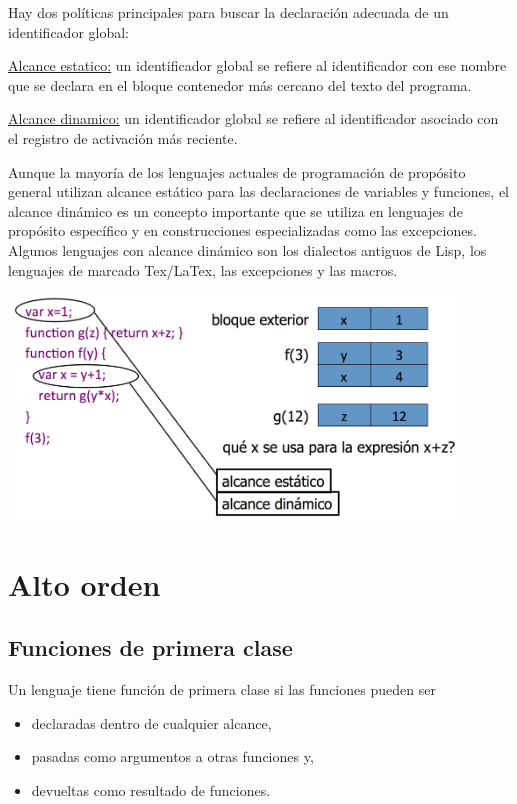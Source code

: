\documentclass[10pt,a4paper]{report}
\begin{document}
Hay dos políticas principales para buscar la declaración adecuada de
un identificador global:

\begin{description}
\item \underline{Alcance estatico:} un identificador global se refiere al identificador con ese nombre que se declara en el bloque contenedor más cercano del texto del programa.
\item \underline{Alcance dinamico:} un identificador global se refiere al identificador asociado con el registro de activación más reciente.
\end{description}

\par Aunque la mayoría de los lenguajes actuales de programación de
propósito general utilizan alcance estático para las declaraciones de
variables y funciones, el alcance dinámico es un concepto importante
que se utiliza en lenguajes de propósito específico y en
construcciones especializadas como las excepciones. Algunos lenguajes
con alcance dinámico son los dialectos antiguos de Lisp, los lenguajes
de marcado Tex/LaTex, las excepciones y las macros.

\begin{center}  
        \includegraphics[width=12cm, height=6cm]{estaticodinamico.png}
\end{center}

\section{Alto orden}

\subsection{Funciones de primera clase}

Un lenguaje tiene función de primera clase si las funciones pueden ser
\begin{itemize}
\item declaradas dentro de cualquier alcance,
\item pasadas como argumentos a otras funciones y, 
\item devueltas como resultado de funciones.
\end{itemize}
\end{document}
